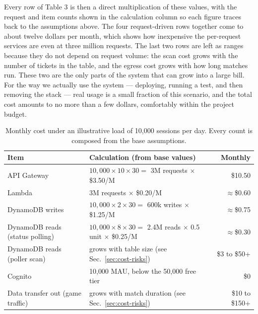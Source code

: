     Every row of Table 3 is then a direct multiplication of these values, with the request and item counts shown in the calculation column so each figure traces back to the assumptions above. The four request-driven rows together come to about twelve dollars per month, which shows how inexpensive the per-request services are even at three million requests. The last two rows are left as ranges because they do not depend on request volume: the scan cost grows with the number of tickets in the table, and the egress cost grows with how long matches run. These two are the only parts of the system that can grow into a large bill.
    For the way we actually use the system --- deploying, running a test, and then removing the stack --- real usage is a small fraction of this scenario, and the total cost amounts to no more than a few dollars, comfortably within the project budget.

    \begin{table}[t]
        \centering
        \footnotesize
        \caption{Monthly cost under an illustrative load of 10{,}000 sessions per day. Every count is composed from the base assumptions.}
        \label{tab:load}
        \begin{tabular}{p{3.4cm} p{8.2cm} r}
            \toprule
            \textbf{Item} & \textbf{Calculation (from base values)} & \textbf{Monthly} \\
            \midrule
            API Gateway & $10{,}000 \times 10 \times 30 =$ 3M requests $\times$ \$3.50/M & \$10.50 \\
            Lambda & 3M requests $\times$ \$0.20/M & $\approx$\$0.60 \\
            DynamoDB writes & $10{,}000 \times 2 \times 30 =$ 600k writes $\times$ \$1.25/M & $\approx$\$0.75 \\
            DynamoDB reads (status polling) & $10{,}000 \times 8 \times 30 =$ 2.4M reads $\times$ 0.5 unit $\times$ \$0.25/M & $\approx$\$0.30 \\
            DynamoDB reads (poller scan) & grows with table size (see Sec.~\ref{sec:cost-risks}) & \$3 to \$50+ \\
            Cognito & 10{,}000 MAU, below the 50{,}000 free tier & \$0 \\
            Data transfer out (game traffic) & grows with match duration (see Sec.~\ref{sec:cost-risks}) & \$10 to \$150+ \\
            \bottomrule
        \end{tabular}
    \end{table}

